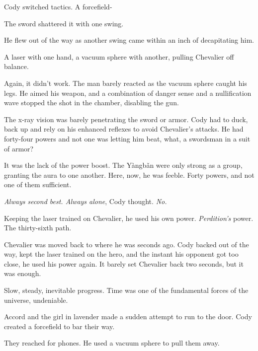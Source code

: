 Cody switched tactics.  A forcefield-



The sword shattered it with one swing.



He flew out of the way as another swing came within an inch of decapitating him.



A laser with one hand, a vacuum sphere with another, pulling Chevalier off balance.



Again, it didn't work.  The man barely reacted as the vacuum sphere caught his legs.  He aimed his weapon, and a combination of danger sense and a nullification wave stopped the shot in the chamber, disabling the gun.



The x-ray vision was barely penetrating the sword or armor.  Cody had to duck, back up and rely on his enhanced reflexes to avoid Chevalier's attacks.  He had forty-four powers and not one was letting him beat, what, a swordsman in a suit of armor?



It was the lack of the power boost.  The Y\`{a}ngb\v{a}n were only strong as a group, granting the aura to one another.  Here, now, he was feeble.  Forty powers, and not one of them sufficient.



\emph{Always second best.  Always alone}, Cody thought.  \emph{No.}



Keeping the laser trained on Chevalier, he used his own power.  \emph{Perdition's} power.  The thirty-sixth path.



Chevalier was moved back to where he was seconds ago.  Cody backed out of the way, kept the laser trained on the hero, and the instant his opponent got too close, he used his power again.  It barely set Chevalier back two seconds, but it was enough.



Slow, steady, inevitable progress.  Time was one of the fundamental forces of the universe, undeniable.



Accord and the girl in lavender made a sudden attempt to run to the door.  Cody created a forcefield to bar their way.



They reached for phones.  He used a vacuum sphere to pull them away.



